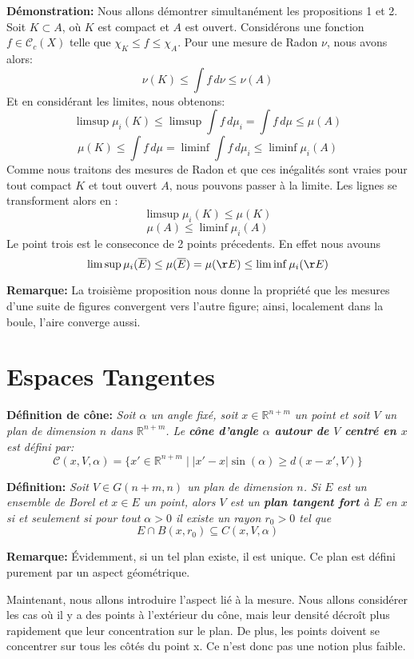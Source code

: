 \documentclass{article}
\begin{document}
\vspace{1ex}
\textbf{Démonstration:}
Nous allons démontrer simultanément les propositions 1 et 2. Soit $K \subset A$,
où $K$ est compact et $A$ est ouvert. Considérons une fonction $f\in\mathcal{C}
_c(X)$ telle que $\chi_K\leq f\leq\chi_A$. Pour une mesure de Radon $\nu$, nous
avons alors:
\[\nu(K) \leq \int f \,d\nu \leq \nu(A)\]
Et en considérant les limites, nous obtenons:
\[\limsup \mu_i(K) \leq \limsup \int f \,d\mu_i = \int f \,d\mu \leq \mu(A)\]
\[\mu(K) \leq \int f \,d\mu = \liminf \int f \,d\mu_i \leq \liminf \mu_i(A)\]
Comme nous traitons des mesures de Radon et que ces inégalités sont vraies pour
tout compact $K$ et tout ouvert $A$, nous pouvons passer à la limite. Les
lignes se transforment alors en :
\[\limsup \mu_i(K) \leq \mu(K)\]
\[\mu(A) \leq \liminf \mu_i(A)\]
Le point trois est le conseconce de 2 points précedents. En effet nous avouns
\[\limsup\mu_i(\overline E)\leq\mu(\overline E)=\mu(\r E)\leq\liminf\mu_i(\r E)\]

\vspace{2ex}
\textbf{Remarque:}  La troisième proposition nous donne la propriété que les
mesures d'une suite de figures convergent vers l'autre figure; ainsi,
localement dans la boule, l'aire converge aussi.

\section{Espaces Tangentes}
\textbf{Définition de cône:} \textit{Soit $\alpha$ un angle fixé, soit $x\in\mathbb
R^{n+m}$ un point et soit $V$ un plan de dimension $n$ dans $\mathbb R^{n+m}$.
Le \textbf{cône d'angle $\alpha$ autour de $V$ centré en $x$} est défini par:
\[\mathcal C(x,V,\alpha)=\{x'\in\mathbb R^{n+m}\;|\; |x′−x|\sin(\alpha)\geq d(x−x′, V)\}\]
}

\vspace{2ex}
\textbf{Définition:} \textit{Soit $V\in G(n+m,n)$ un plan de dimension $n$. Si
$E$ est un ensemble de Borel et $x\in E$ un point, alors $V$ est un \textbf{plan
tangent fort} à $E$ en $x$ si et seulement si pour tout $\alpha >0$ il existe un rayon $r_0
>0$ tel que
\[E∩B(x, r_0)\subseteq C(x, V, \alpha)\]}

\vspace{1ex}
\textbf{Remarque:} Évidemment, si un tel plan existe, il est unique. Ce plan
est défini purement par un aspect géométrique.

\vspace{2ex}
Maintenant, nous allons introduire l'aspect lié à la mesure. Nous allons
considérer les cas où il y a des points à l'extérieur du cône, mais leur
densité décroît plus rapidement que leur concentration sur le plan. De plus,
les points doivent se concentrer sur tous les côtés du point x. Ce n'est donc
pas une notion plus faible.
\end{document}
